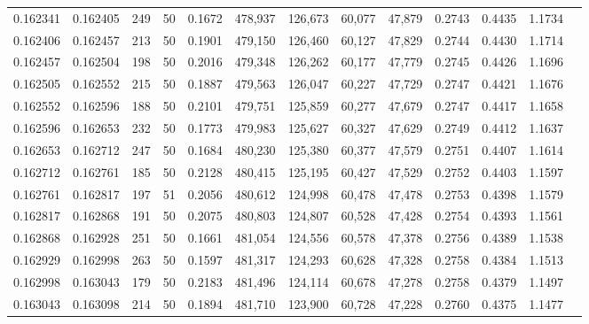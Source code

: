 \begin{tabular}{rrrrrrrrrrrrr}
0.162341 & 0.162405 &   249 &  50 &                                     0.1672 & 478,937 & 126,673 &  60,077 &  47,879 & 0.2743 & 0.4435 & 1.1734 \\
0.162406 & 0.162457 &   213 &  50 &                                     0.1901 & 479,150 & 126,460 &  60,127 &  47,829 & 0.2744 & 0.4430 & 1.1714 \\
0.162457 & 0.162504 &   198 &  50 &                                     0.2016 & 479,348 & 126,262 &  60,177 &  47,779 & 0.2745 & 0.4426 & 1.1696 \\
0.162505 & 0.162552 &   215 &  50 &                                     0.1887 & 479,563 & 126,047 &  60,227 &  47,729 & 0.2747 & 0.4421 & 1.1676 \\
0.162552 & 0.162596 &   188 &  50 &                                     0.2101 & 479,751 & 125,859 &  60,277 &  47,679 & 0.2747 & 0.4417 & 1.1658 \\
0.162596 & 0.162653 &   232 &  50 &                                     0.1773 & 479,983 & 125,627 &  60,327 &  47,629 & 0.2749 & 0.4412 & 1.1637 \\
0.162653 & 0.162712 &   247 &  50 &                                     0.1684 & 480,230 & 125,380 &  60,377 &  47,579 & 0.2751 & 0.4407 & 1.1614 \\
0.162712 & 0.162761 &   185 &  50 &                                     0.2128 & 480,415 & 125,195 &  60,427 &  47,529 & 0.2752 & 0.4403 & 1.1597 \\
0.162761 & 0.162817 &   197 &  51 &                                     0.2056 & 480,612 & 124,998 &  60,478 &  47,478 & 0.2753 & 0.4398 & 1.1579 \\
0.162817 & 0.162868 &   191 &  50 &                                     0.2075 & 480,803 & 124,807 &  60,528 &  47,428 & 0.2754 & 0.4393 & 1.1561 \\
0.162868 & 0.162928 &   251 &  50 &                                     0.1661 & 481,054 & 124,556 &  60,578 &  47,378 & 0.2756 & 0.4389 & 1.1538 \\
0.162929 & 0.162998 &   263 &  50 &                                     0.1597 & 481,317 & 124,293 &  60,628 &  47,328 & 0.2758 & 0.4384 & 1.1513 \\
0.162998 & 0.163043 &   179 &  50 &                                     0.2183 & 481,496 & 124,114 &  60,678 &  47,278 & 0.2758 & 0.4379 & 1.1497 \\
0.163043 & 0.163098 &   214 &  50 &                                     0.1894 & 481,710 & 123,900 &  60,728 &  47,228 & 0.2760 & 0.4375 & 1.1477 \\

\end{tabular}
